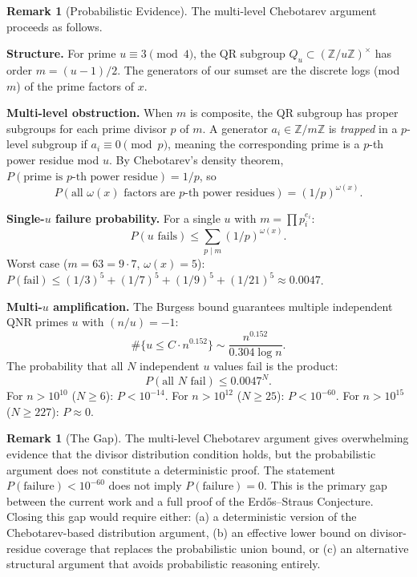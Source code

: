 \documentclass[11pt,a4paper]{article}
\theoremstyle{plain}
\theoremstyle{plain}
\theoremstyle{definition}
\newtheorem{remark}[theorem]{Remark}
\numberwithin{equation}{section}
\begin{document}
\begin{remark}[Probabilistic Evidence]
The multi-level Chebotarev argument proceeds as follows.

\textbf{Structure.} For prime $u \equiv 3 \pmod{4}$, the QR subgroup $Q_u \subset (\mathbb{Z}/u\mathbb{Z})^\times$ has order $m = (u-1)/2$. The generators of our sumset are the discrete logs (mod $m$) of the prime factors of $x$.

\textbf{Multi-level obstruction.} When $m$ is composite, the QR subgroup has proper subgroups for each prime divisor $p$ of $m$. A generator $a_i \in \mathbb{Z}/m\mathbb{Z}$ is \emph{trapped} in a $p$-level subgroup if $a_i \equiv 0 \pmod{p}$, meaning the corresponding prime is a $p$-th power residue mod $u$. By Chebotarev's density theorem, $P(\text{prime is $p$-th power residue}) = 1/p$, so
\begin{equation}
P(\text{all } \omega(x) \text{ factors are $p$-th power residues}) = (1/p)^{\omega(x)}.
\end{equation}

\textbf{Single-$u$ failure probability.} For a single $u$ with $m = \prod p_i^{e_i}$:
\begin{equation}
P(u \text{ fails}) \leq \sum_{p \mid m} (1/p)^{\omega(x)}.
\end{equation}
Worst case ($m = 63 = 9 \cdot 7$, $\omega(x) = 5$): $P(\text{fail}) \leq (1/3)^5 + (1/7)^5 + (1/9)^5 + (1/21)^5 \approx 0.0047$.

\textbf{Multi-$u$ amplification.} The Burgess bound guarantees multiple independent QNR primes $u$ with $(n/u) = -1$:
\begin{equation}
\#\{u \leq C \cdot n^{0.152}\} \sim \frac{n^{0.152}}{0.304 \log n}.
\end{equation}
The probability that all $N$ independent $u$ values fail is the product:
\begin{equation}
P(\text{all } N \text{ fail}) \leq 0.0047^N.
\end{equation}
For $n > 10^{10}$ ($N \geq 6$): $P < 10^{-14}$. For $n > 10^{12}$ ($N \geq 25$): $P < 10^{-60}$. For $n > 10^{15}$ ($N \geq 227$): $P \approx 0$.
\end{remark}

\begin{remark}[The Gap]
The multi-level Chebotarev argument gives overwhelming evidence that the divisor distribution condition holds, but the probabilistic argument does not constitute a deterministic proof. The statement $P(\text{failure}) < 10^{-60}$ does not imply $P(\text{failure}) = 0$. This is the primary gap between the current work and a full proof of the Erd\H{o}s--Straus Conjecture. Closing this gap would require either: (a) a deterministic version of the Chebotarev-based distribution argument, (b) an effective lower bound on divisor-residue coverage that replaces the probabilistic union bound, or (c) an alternative structural argument that avoids probabilistic reasoning entirely.
\end{remark}
\end{document}
